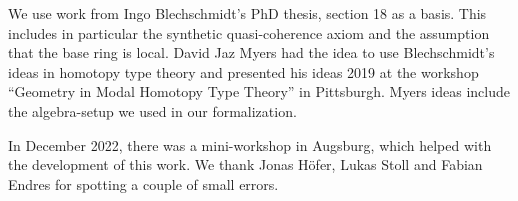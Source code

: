 We use work from Ingo Blechschmidt's PhD thesis, section 18 as a basis.
This includes in particular the synthetic quasi-coherence axiom and the assumption that the base ring is local.
David Jaz Myers had the idea to use Blechschmidt's ideas in homotopy type theory
and presented his ideas 2019 at the workshop ``Geometry in Modal Homotopy Type Theory'' in Pittsburgh.
Myers ideas include the algebra-setup we used in our formalization.

In December 2022, there was a mini-workshop in Augsburg, which helped with the development of this work.
We thank Jonas Höfer, Lukas Stoll and Fabian Endres for spotting a couple of small errors.
